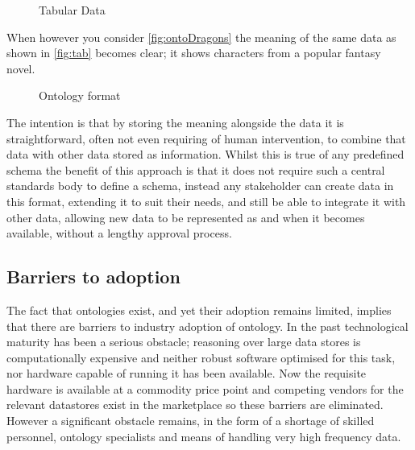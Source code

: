 \begin{figure}[!htbp]
\myfloatalign
{}
\caption{Tabular Data}
\label{fig:tab}
\end{figure}

 When however you consider \autoref{fig:ontoDragons} the meaning of the same data as shown in \autoref{fig:tab} becomes clear; it shows characters from a popular fantasy novel. 

\begin{figure}[!htbp]
\myfloatalign
{}
\caption{Ontology format}
\label{fig:ontoDragons}
\end{figure}

The intention is that by storing the meaning alongside the data it is straightforward, often not even requiring of human intervention, to combine that data with other data stored as information. Whilst this is true of any predefined schema the benefit of this approach is that it does not require such a central standards body to define a schema, instead any stakeholder can create data in this format, extending it to suit their needs, and still be able to integrate it with other data, allowing new data to be represented as and when it becomes available, without a lengthy approval process. 

\subsection{Barriers to adoption}
The fact that ontologies exist, and yet their adoption remains limited, implies that there are barriers to industry adoption of ontology. In the past technological maturity has been a serious obstacle; reasoning over large data stores is computationally expensive and neither robust software optimised for this task, nor hardware capable of running it has been available. Now the requisite hardware is available at a commodity price point and competing vendors for the relevant datastores exist in the marketplace so these barriers are eliminated. However a significant obstacle remains, in the form of a shortage of skilled personnel, ontology specialists and means of handling very high frequency data.

